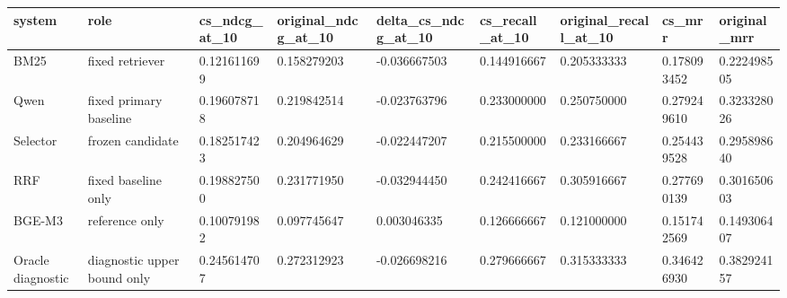 \begin{tabular}{lllllllll}
\toprule
system & role & cs\_ndcg\_at\_10 & original\_ndcg\_at\_10 & delta\_cs\_ndcg\_at\_10 & cs\_recall\_at\_10 & original\_recall\_at\_10 & cs\_mrr & original\_mrr \\
\midrule
BM25 & fixed retriever & 0.121611699 & 0.158279203 & -0.036667503 & 0.144916667 & 0.205333333 & 0.178093452 & 0.222498505 \\
Qwen & fixed primary baseline & 0.196078718 & 0.219842514 & -0.023763796 & 0.233000000 & 0.250750000 & 0.279249610 & 0.323328026 \\
Selector & frozen candidate & 0.182517423 & 0.204964629 & -0.022447207 & 0.215500000 & 0.233166667 & 0.254439528 & 0.295898640 \\
RRF & fixed baseline only & 0.198827500 & 0.231771950 & -0.032944450 & 0.242416667 & 0.305916667 & 0.277690139 & 0.301650603 \\
BGE-M3 & reference only & 0.100791982 & 0.097745647 & 0.003046335 & 0.126666667 & 0.121000000 & 0.151742569 & 0.149306407 \\
Oracle diagnostic & diagnostic upper bound only & 0.245614707 & 0.272312923 & -0.026698216 & 0.279666667 & 0.315333333 & 0.346426930 & 0.382924157 \\
\bottomrule
\end{tabular}
